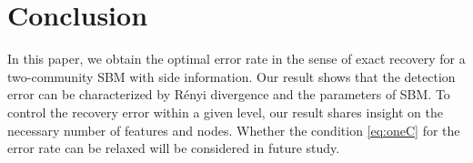 \documentclass[conference,letterpaper]{IEEEtran}
\begin{document}
\section{Conclusion}\label{s:conclusion}
In this paper, we obtain the optimal error rate in the sense of exact recovery for a two-community SBM with side information. Our result
shows that the detection error can be characterized by Rényi divergence and the parameters of SBM. To control the recovery error within a given level,
our result shares insight on
the necessary number of features and nodes.
Whether the condition \eqref{eq:oneC} for the error rate can be relaxed
will be considered in future study.


\end{document}
